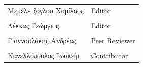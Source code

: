 \documentclass{../ol-softwaremanual}
\begin{document}
	
	\vspace{20pt}
	
	\begin{table}[htbp!]
		\begin{tabular}{ll}
			Μεμελετζόγλου Χαρίλαος & \en Editor \\
			\\ Λέκκας Γεώργιος      &   \en  Editor \\
			\\ Γιαννουλάκης Ανδρέας & \en Peer Reviewer \\
			\\ Κανελλόπουλος Ιωακείμ & \en Contributor \\ 
		\end{tabular}
	\end{table}
	
	
	\vspace{20pt}
	
		
	\vspace{10pt}
	\flushleft
	
\end{document}
